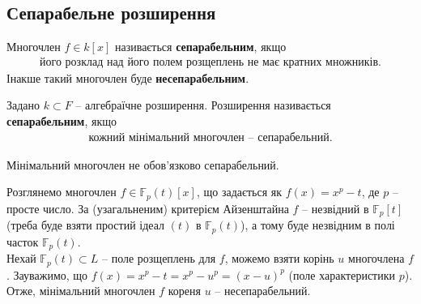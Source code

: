 \documentclass{math_library}
\begin{document}
\subsection{Сепарабельне розширення}
\begin{definition}
Многочлен $f \in k[x]$ називається \textbf{сепарабельним}, якщо
\begin{align*}
\text{його розклад над його полем розщеплень не має кратних множників.}
\end{align*}
Інакше такий многочлен буде \textbf{несепарабельним}.
\end{definition}

\begin{definition}
Задано $k \subset F$ -- алгебраїчне розширення.
Розширення називається \textbf{сепарабельним}, якщо
\begin{align*}
\text{кожний мінімальний многочлен -- сепарабельний.}
\end{align*}
\end{definition}

\begin{remark}
Мінімальний многочлен не обов'язково сепарабельний.
\end{remark}

\begin{example}
Розглянемо многочлен $f \in \mathbb{F}_p(t)[x]$, що задається як $f(x) = x^p - t$, де $p$ -- просте число. За (узагальненим) критерієм Айзенштайна $f$ -- незвідний в $\mathbb{F}_p[t]$ (треба буде взяти простий ідеал $(t)$ в $\mathbb{F}_p(t)$), а тому буде незвідним в полі часток $\mathbb{F}_p(t)$.\\
Нехай $\mathbb{F}_p(t) \subset L$ -- поле розщеплень для $f$, можемо взяти корінь $u$ многочлена $f$. Зауважимо, що $f(x) = x^p - t = x^p - u^p = (x-u)^p$ (поле характеристики $p$). Отже, мінімальний многочлен $f$ кореня $u$ -- несепарабельний.
\end{example}

\end{document}
